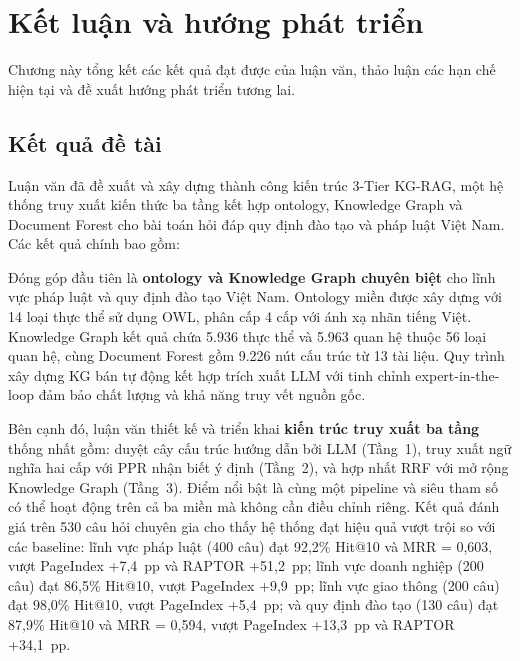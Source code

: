\chapter{Kết luận và hướng phát triển}
\label{chap:chapter5}

Chương này tổng kết các kết quả đạt được của luận văn, thảo luận các hạn chế hiện tại và đề xuất hướng phát triển tương lai.

\section{Kết quả đề tài}
\label{sec:ket-qua-de-tai}

Luận văn đã đề xuất và xây dựng thành công kiến trúc 3-Tier KG-RAG, một hệ thống truy xuất kiến thức ba tầng kết hợp ontology, Knowledge Graph và Document Forest cho bài toán hỏi đáp quy định đào tạo và pháp luật Việt Nam. Các kết quả chính bao gồm:

Đóng góp đầu tiên là \textbf{ontology và Knowledge Graph chuyên biệt} cho lĩnh vực pháp luật và quy định đào tạo Việt Nam. Ontology miền được xây dựng với 14 loại thực thể sử dụng OWL, phân cấp 4 cấp với ánh xạ nhãn tiếng Việt. Knowledge Graph kết quả chứa 5.936 thực thể và 5.963 quan hệ thuộc 56 loại quan hệ, cùng Document Forest gồm 9.226 nút cấu trúc từ 13 tài liệu. Quy trình xây dựng KG bán tự động kết hợp trích xuất LLM với tinh chỉnh expert-in-the-loop đảm bảo chất lượng và khả năng truy vết nguồn gốc.

Bên cạnh đó, luận văn thiết kế và triển khai \textbf{kiến trúc truy xuất ba tầng} thống nhất gồm: duyệt cây cấu trúc hướng dẫn bởi LLM (Tầng~1), truy xuất ngữ nghĩa hai cấp với PPR nhận biết ý định (Tầng~2), và hợp nhất RRF với mở rộng Knowledge Graph (Tầng~3). Điểm nổi bật là cùng một pipeline và siêu tham số có thể hoạt động trên cả ba miền mà không cần điều chỉnh riêng. Kết quả đánh giá trên 530 câu hỏi chuyên gia cho thấy hệ thống đạt hiệu quả vượt trội so với các baseline: lĩnh vực pháp luật (400 câu) đạt 92,2\% Hit@10 và MRR = 0,603, vượt PageIndex +7,4~pp và RAPTOR +51,2~pp; lĩnh vực doanh nghiệp (200 câu) đạt 86,5\% Hit@10, vượt PageIndex +9,9~pp; lĩnh vực giao thông (200 câu) đạt 98,0\% Hit@10, vượt PageIndex +5,4~pp; và quy định đào tạo (130 câu) đạt 87,9\% Hit@10 và MRR = 0,594, vượt PageIndex +13,3~pp và RAPTOR +34,1~pp.

